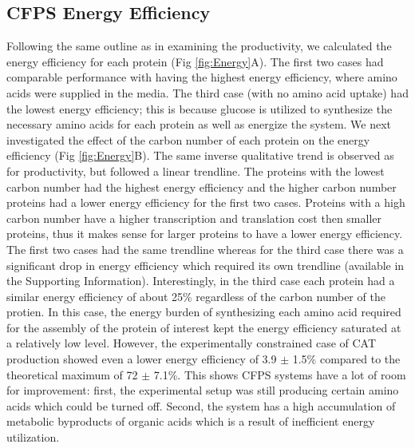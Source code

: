 \documentclass[journal=asbcd6,manuscript=article]{achemso}
\begin{document}
\subsection{CFPS Energy Efficiency}
Following the same outline as in examining the productivity, we calculated the energy efficiency for each protein (Fig \ref{fig:Energy}A).
The first two cases had comparable performance with having the highest energy efficiency, where amino acids were supplied in the media.
The third case (with no amino acid uptake) had the lowest energy efficiency; this is because glucose is utilized to synthesize the necessary amino acids for each protein as well as energize the system. 
We next investigated the effect of the carbon number of each protein on the energy efficiency (Fig \ref{fig:Energy}B).
The same inverse qualitative trend is observed as for productivity, but followed a linear trendline.
The proteins with the lowest carbon number had the highest energy efficiency and the higher carbon number proteins had a lower energy efficiency for the first two cases.
Proteins with a high carbon number have a higher transcription and translation cost then smaller proteins, thus it makes sense for larger proteins to have a lower energy efficiency.  
The first two cases had the same trendline whereas for the third case there was a significant drop in energy efficiency which required its own trendline (available in the Supporting Information). 
Interestingly, in the third case each protein had a similar energy efficiency of about 25\% regardless of the carbon number of the protien. 
In this case, the energy burden of synthesizing each amino acid required for the assembly of the protein of interest kept the energy efficiency saturated at a relatively low level.
However, the experimentally constrained case of CAT production showed even a lower energy efficiency of 3.9 $\pm$ 1.5\% compared to the theoretical maximum of 72 $\pm$ 7.1\%. 
This shows CFPS systems have a lot of room for improvement: first, the experimental setup was still producing certain amino acids which could be turned off. 
Second, the system has a high accumulation of metabolic byproducts of organic acids which is a result of inefficient energy utilization.
\end{document}
